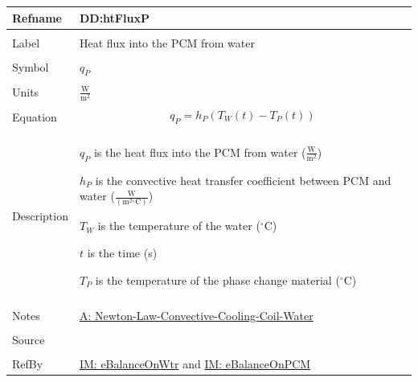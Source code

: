 \documentclass[12pt]{article}
\begin{document}
\noindent \begin{minipage}{\textwidth}
\begin{tabular}{p{} p{}}
\toprule \textbf{Refname} & \textbf{DD:htFluxP}
\label{DD:htFluxP}
\\ \midrule \\
Label & Heat flux into the PCM from water
\\ \midrule \\
Symbol & ${q_{P}}$
\\ \midrule \\
Units & $\frac{\text{W}}{\text{m}^{2}}$
\\ \midrule \\
Equation & \begin{displaymath}
           {q_{P}}={h_{P}} \left({T_{W}}\left(t\right)-{T_{P}}\left(t\right)\right)
           \end{displaymath}
\\ \midrule \\
Description & \begin{symbDescription}
              \item{${q_{P}}$ is the heat flux into the PCM from water ($\frac{\text{W}}{\text{m}^{2}}$)}
              \item{${h_{P}}$ is the convective heat transfer coefficient between PCM and water ($\frac{\text{W}}{(\text{m}^{2}{}^{\circ}\text{C})}$)}
              \item{${T_{W}}$ is the temperature of the water (${}^{\circ}$C)}
              \item{$t$ is the time (s)}
              \item{${T_{P}}$ is the temperature of the phase change material (${}^{\circ}$C)}
              \end{symbDescription}
\\ \midrule \\
Notes & \hyperref[assumpLCCCW]{A: Newton-Law-Convective-Cooling-Coil-Water}
\\ \midrule \\
Source & \cite{koothoor2013}
\\ \midrule \\
RefBy & \hyperref[IM:eBalanceOnWtr]{IM: eBalanceOnWtr} and \hyperref[IM:eBalanceOnPCM]{IM: eBalanceOnPCM}
\\ \bottomrule \end{tabular}
\end{minipage}
\par~
\end{document}
